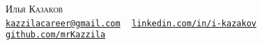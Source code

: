 \begin{center}
  {\huge \scshape Илья Казаков} \\
  \vspace{4pt}
  \small \href{mailto:kazzilacareer@gmail.com}{\texttt{kazzilacareer@gmail.com}} ~
  \href{https://linkedin.com/in/i-kazakov}{\texttt{linkedin.com/in/i-kazakov}} ~
  \href{https://github.com/mrKazzila}{\texttt{github.com/mrKazzila}}
  \vspace{-5pt}
\end{center}